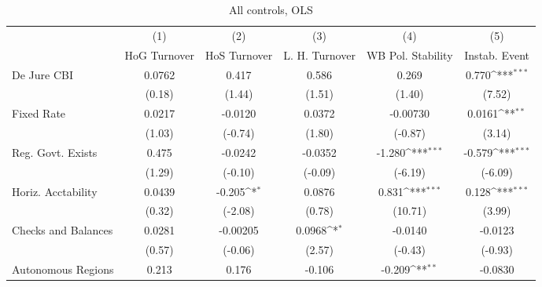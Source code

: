 \begin{table}[htbp]\centering
\def\sym#1{\ifmmode^{#1}\else\(^{#1}\)\fi}
\caption{All controls, OLS \label{fullcmultIndOLSDJ}}
\begin{tabular}{l*{5}{c}}
\toprule
                                        &\multicolumn{1}{c}{(1)}&\multicolumn{1}{c}{(2)}&\multicolumn{1}{c}{(3)}&\multicolumn{1}{c}{(4)}&\multicolumn{1}{c}{(5)}\\
                                        &\multicolumn{1}{c}{HoG Turnover}&\multicolumn{1}{c}{HoS Turnover}&\multicolumn{1}{c}{L. H. Turnover}&\multicolumn{1}{c}{WB Pol. Stability}&\multicolumn{1}{c}{Instab. Event}\\
\midrule
De Jure CBI                             &   0.0762         &    0.417         &    0.586         &    0.269         &    0.770\sym{***}\\
                                        &   (0.18)         &   (1.44)         &   (1.51)         &   (1.40)         &   (7.52)         \\
\addlinespace
Fixed Rate                              &   0.0217         &  -0.0120         &   0.0372         & -0.00730         &   0.0161\sym{**} \\
                                        &   (1.03)         &  (-0.74)         &   (1.80)         &  (-0.87)         &   (3.14)         \\
\addlinespace
Reg. Govt. Exists                       &    0.475         &  -0.0242         &  -0.0352         &   -1.280\sym{***}&   -0.579\sym{***}\\
                                        &   (1.29)         &  (-0.10)         &  (-0.09)         &  (-6.19)         &  (-6.09)         \\
\addlinespace
Horiz. Acctability                      &   0.0439         &   -0.205\sym{*}  &   0.0876         &    0.831\sym{***}&    0.128\sym{***}\\
                                        &   (0.32)         &  (-2.08)         &   (0.78)         &  (10.71)         &   (3.99)         \\
\addlinespace
Checks and Balances                     &   0.0281         & -0.00205         &   0.0968\sym{*}  &  -0.0140         &  -0.0123         \\
                                        &   (0.57)         &  (-0.06)         &   (2.57)         &  (-0.43)         &  (-0.93)         \\
\addlinespace
Autonomous Regions                      &    0.213         &    0.176         &   -0.106         &   -0.209\sym{**} &  -0.0830         \\

\end{tabular}
\end{table}
